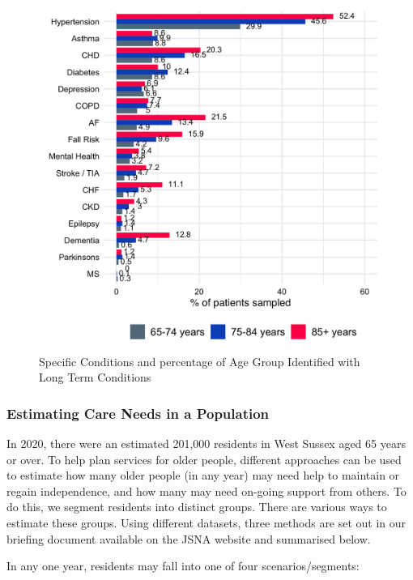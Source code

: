 \begin{figure}[H]
\caption{Specific Conditions and percentage of Age Group Identified with Long Term Conditions}\label{fig:gprd_seg_ltc}
\centering
\includegraphics[width=\linewidth]{images/GPRD_seg_ltc.png}
\end{figure}

\newpage

\subsubsection{Estimating Care Needs in a Population}
In 2020, there were an estimated 201,000 residents in West Sussex aged 65 years or over. To help plan services for older people, different approaches can be used to estimate how many older people (in any year) may need help to maintain or regain independence, and how many may need on-going support from others. To do this, we segment residents into distinct groups. There are various ways to estimate these groups. Using different datasets, three methods are set out in our briefing document available on the JSNA website and summarised below.

In any one year, residents may fall into one of four scenarios/segments:

